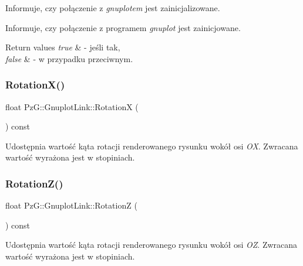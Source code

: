 Informuje, czy połączenie z {\itshape gnuplot\textquotesingle{}em} jest zainicjalizowane. 

Informuje, czy połączenie z programem {\itshape gnuplot} jest zainicjowane. 
\begin{DoxyRetVals}{Return values}
{\em true} & -\/ jeśli tak, \\
\hline
{\em false} & -\/ w przypadku przeciwnym. \\
\hline
\end{DoxyRetVals}
\mbox{\label{class_pz_g_1_1_gnuplot_link_a93c58deadc1c9bb9b85a5fa51d5d946a}} 
\subsubsection{\texorpdfstring{Rotation\+X()}{RotationX()}}
{\footnotesize\ttfamily float Pz\+G\+::\+Gnuplot\+Link\+::\+RotationX (\begin{DoxyParamCaption}{ }\end{DoxyParamCaption}) const\hspace{0.3cm}{\ttfamily [inline]}}

Udostępnia wartość kąta rotacji renderowanego rysunku wokół osi {\itshape OX}. Zwracana wartość wyrażona jest w stopiniach. \mbox{\label{class_pz_g_1_1_gnuplot_link_aa734824e9997fb565da289791f03d149}} 
\subsubsection{\texorpdfstring{Rotation\+Z()}{RotationZ()}}
{\footnotesize\ttfamily float Pz\+G\+::\+Gnuplot\+Link\+::\+RotationZ (\begin{DoxyParamCaption}{ }\end{DoxyParamCaption}) const\hspace{0.3cm}{\ttfamily [inline]}}

Udostępnia wartość kąta rotacji renderowanego rysunku wokół osi {\itshape OZ}. Zwracana wartość wyrażona jest w stopiniach. \mbox{\label{class_pz_g_1_1_gnuplot_link_ab6bf77a1d62d351a2edb737c48d9353d}} 
